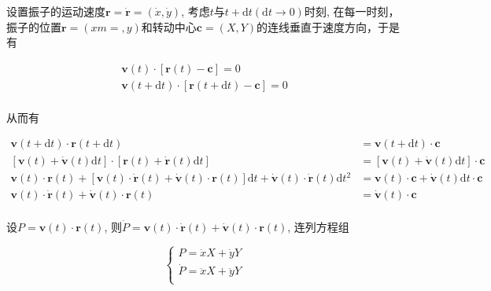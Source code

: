 \documentclass{article}
\begin{document}
设置振子的运动速度$\mathbf{r}=\dot{\mathbf{r}}=\left( \dot{x}, \dot{y} \right)$, 考虑$t$与$t+\mathrm{d}t(\mathrm{d}t\rightarrow0)$时刻, 在每一时刻，振子的位置$\mathbf{r}=(xm=, y)$和转动中心$\mathbf{c}=(X, Y)$的连线垂直于速度方向，于是有

$$
\begin{array}{l}
	\mathbf{v}\left( t \right) \cdot \left[ \mathbf{r}\left( t \right) -\mathbf{c} \right] =0\\
	\mathbf{v}\left( t+\mathrm{d}t \right) \cdot \left[ \mathbf{r}\left( t+\mathrm{d}t \right) -\mathbf{c} \right] =0\\
\end{array}
$$

从而有

$$
\begin{aligned}
	\mathbf{v}\left( t+\mathrm{d}t \right) \cdot \mathbf{r}\left( t+\mathrm{d}t \right) &=\mathbf{v}\left( t+\mathrm{d}t \right) \cdot \mathbf{c}\\
	\left[ \mathbf{v}\left( t \right) +\dot{\mathbf{v}}\left( t \right) \mathrm{d}t \right] \cdot \left[ \mathbf{r}\left( t \right) +\dot{\mathbf{r}}\left( t \right) \mathrm{d}t \right] &=\left[ \mathbf{v}\left( t \right) +\dot{\mathbf{v}}\left( t \right) \mathrm{d}t \right] \cdot \mathbf{c}\\
	\mathbf{v}\left( t \right) \cdot \mathbf{r}\left( t \right) +\left[ \mathbf{v}\left( t \right) \cdot \dot{\mathbf{r}}\left( t \right) +\dot{\mathbf{v}}\left( t \right) \cdot \mathbf{r}\left( t \right) \right] \mathrm{d}t+\dot{\mathbf{v}}\left( t \right) \cdot \dot{\mathbf{r}}\left( t \right) \mathrm{d}t^2&=\mathbf{v}\left( t \right) \cdot \mathbf{c}+\dot{\mathbf{v}}\left( t \right) \mathrm{d}t\cdot \mathbf{c}\\
	\mathbf{v}\left( t \right) \cdot \dot{\mathbf{r}}\left( t \right) +\dot{\mathbf{v}}\left( t \right) \cdot \mathbf{r}\left( t \right) &=\dot{\mathbf{v}}\left( t \right) \cdot \mathbf{c}\\
\end{aligned}
$$

设$P=\mathbf{v}\left( t \right) \cdot \mathbf{r}\left( t \right)$, 则$\dot{P}=\mathbf{v}\left( t \right) \cdot \dot{\mathbf{r}}\left( t \right) +\dot{\mathbf{v}}\left( t \right) \cdot \mathbf{r}\left( t \right) 
$, 连列方程组

$$
\begin{cases}
	P=\dot{x}X+\dot{y}Y\\
	\dot{P}=\ddot{x}X+\ddot{y}Y\\
\end{cases}
$$
\end{document}
